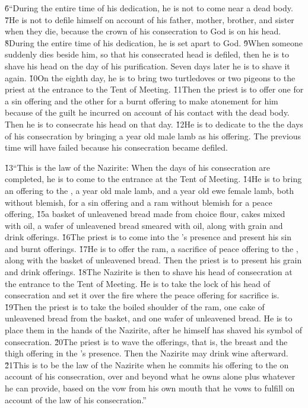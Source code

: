 \v{6}``During the entire time of his dedication, he is not to come near a dead body. \v{7}He is not to defile himself on account of his father, mother, brother, and sister when they die, because the crown of his consecration to God is on his head. \v{8}During the entire time of his dedication, he is set apart to God. \v{9}When someone suddenly dies beside him, so that his consecrated head is defiled, then he is to shave his head on the day of his purification. Seven days later he is to shave it again. \v{10}On the eighth day, he is to bring two turtledoves or two pigeons to the priest at the entrance to the Tent of Meeting. \v{11}Then the priest is to offer one for a sin offering and the other for a burnt offering to make atonement for him because of the guilt he incurred on account of his contact with the dead body. Then he is to consecrate his head on that day. \v{12}He is to dedicate to the  the days of his consecration by bringing a year old male lamb as his offering. The previous time will have failed because his consecration became defiled.

\v{13}``This is the law of the Nazirite: When the days of his consecration are completed, he is to come to the entrance at the Tent of Meeting. \v{14}He is to bring an offering to the , a year old male lamb, and a year old ewe female lamb, both without blemish, for a sin offering and a ram without blemish for a peace offering, \v{15}a basket of unleavened bread made from choice flour, cakes mixed with oil, a wafer of unleavened bread smeared with oil, along with grain and drink offerings. \v{16}The priest is to come into the 's presence and present his sin and burnt offerings. \v{17}He is to offer the ram, a sacrifice of peace offering to the , along with the basket of unleavened bread. Then the priest is to present his grain and drink offerings. \v{18}The Nazirite is then to shave his head of consecration at the entrance to the Tent of Meeting. He is to take the lock of his head of consecration and set it over the fire where the peace offering for sacrifice is. \v{19}Then the priest is to take the boiled shoulder of the ram, one cake of unleavened bread from the basket, and one wafer of unleavened bread. He is to place them in the hands of the Nazirite, after he himself has shaved his symbol of consecration. \v{20}The priest is to wave the offerings, that is, the breast and the thigh offering in the 's presence. Then the Nazirite may drink wine afterward. \v{21}This is to be the law of the Nazirite when he commits his offering to the  on account of his consecration, over and beyond what he owns alone plus whatever he can provide, based on the vow from his own mouth that he vows to fulfill on account of the law of his consecration.''

